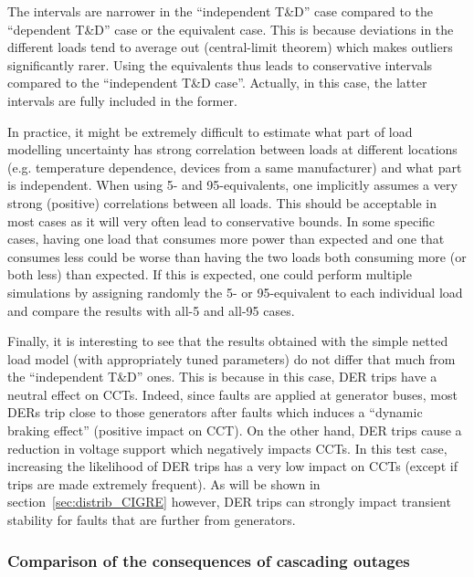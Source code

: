 The intervals are narrower in the ``independent T\&D'' case compared to the ``dependent T\&D'' case or the equivalent case. This is because deviations in the different loads tend to average out (central-limit theorem) which makes outliers significantly rarer. Using the equivalents thus leads to conservative intervals compared to the ``independent T\&D case''. Actually, in this case, the latter intervals are fully included in the former.

In practice, it might be extremely difficult to estimate what part of load modelling uncertainty has strong correlation between loads at different locations (e.g. temperature dependence, devices from a same manufacturer) and what part is independent. When using 5- and 95-equivalents, one implicitly assumes a very strong (positive) correlations between all loads. This should be acceptable in most cases as it will very often lead to conservative bounds. In some specific cases, having one load that consumes more power than expected and one that consumes less could be worse than having the two loads both consuming more (or both less) than expected. If this is expected, one could perform multiple simulations by assigning randomly the 5- or 95-equivalent to each individual load and compare the results with all-5 and all-95 cases. %

Finally, it is interesting to see that the results obtained with the simple netted load model (with appropriately tuned parameters) do not differ that much from the ``independent T\&D'' ones. This is because in this case, DER trips have a neutral effect on CCTs. Indeed, since faults are applied at generator buses, most DERs trip close to those generators after faults which induces a ``dynamic braking effect'' (positive impact on CCT). On the other hand, DER trips cause a reduction in voltage support which negatively impacts CCTs. In this test case, increasing the likelihood of DER trips has a very low impact on CCTs (except if trips are made extremely frequent). As will be shown in section~\ref{sec:distrib_CIGRE} however, DER trips can strongly impact transient stability for faults that are further from generators.



\subsubsection{Comparison of the consequences of cascading outages}
\label{sec:isgt_results_cascading}

